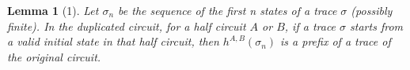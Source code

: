 \documentclass{article}
\newtheorem*{lemma}{Lemma}
\begin{document}
\begin{lemma}[1]
Let $\sigma_n$ be the sequence of the first n states of a trace $\sigma$ (possibly finite).  In the duplicated circuit, for a half circuit $A$ or $B$, if a trace $\sigma$ starts from a valid initial state in that half circuit, then $h^{A,B}(\sigma_n)$ is a prefix of a trace of the original circuit.


\end{lemma}
\end{document}
